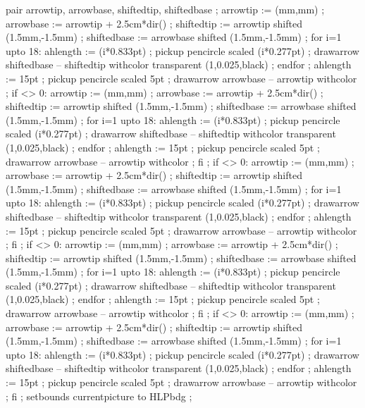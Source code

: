 pair arrowtip, arrowbase, shiftedtip, shiftedbase ;
arrowtip := (mm,mm) ;
arrowbase := arrowtip + 2.5cm*dir() ;
shiftedtip := arrowtip shifted (1.5mm,-1.5mm) ;
shiftedbase := arrowbase shifted (1.5mm,-1.5mm) ;
for i=1 upto 18:
	ahlength := (i*0.833pt) ;
	pickup pencircle scaled (i*0.277pt) ;
	drawarrow shiftedbase -- shiftedtip withcolor transparent (1,0.025,black) ;
endfor ;
ahlength := 15pt ;
pickup pencircle scaled 5pt ;
drawarrow arrowbase -- arrowtip withcolor  ;
if  <> 0:
   arrowtip := (mm,mm) ;
   arrowbase := arrowtip + 2.5cm*dir() ;
   shiftedtip := arrowtip shifted (1.5mm,-1.5mm) ;
   shiftedbase := arrowbase shifted (1.5mm,-1.5mm) ;
   for i=1 upto 18:
   	ahlength := (i*0.833pt) ;
   	pickup pencircle scaled (i*0.277pt) ;
   	drawarrow shiftedbase -- shiftedtip withcolor transparent (1,0.025,black) ;
   endfor ;
   ahlength := 15pt ;
   pickup pencircle scaled 5pt ;
   drawarrow arrowbase -- arrowtip withcolor  ;
fi ;
if  <> 0:
   arrowtip := (mm,mm) ;
   arrowbase := arrowtip + 2.5cm*dir() ;
   shiftedtip := arrowtip shifted (1.5mm,-1.5mm) ;
   shiftedbase := arrowbase shifted (1.5mm,-1.5mm) ;
   for i=1 upto 18:
   	ahlength := (i*0.833pt) ;
   	pickup pencircle scaled (i*0.277pt) ;
   	drawarrow shiftedbase -- shiftedtip withcolor transparent (1,0.025,black) ;
   endfor ;
   ahlength := 15pt ;
   pickup pencircle scaled 5pt ;
   drawarrow arrowbase -- arrowtip withcolor  ;
fi ;
if  <> 0:
   arrowtip := (mm,mm) ;
   arrowbase := arrowtip + 2.5cm*dir() ;
   shiftedtip := arrowtip shifted (1.5mm,-1.5mm) ;
   shiftedbase := arrowbase shifted (1.5mm,-1.5mm) ;
   for i=1 upto 18:
   	ahlength := (i*0.833pt) ;
   	pickup pencircle scaled (i*0.277pt) ;
   	drawarrow shiftedbase -- shiftedtip withcolor transparent (1,0.025,black) ;
   endfor ;
   ahlength := 15pt ;
   pickup pencircle scaled 5pt ;
   drawarrow arrowbase -- arrowtip withcolor  ;
fi ;
if  <> 0:
   arrowtip := (mm,mm) ;
   arrowbase := arrowtip + 2.5cm*dir() ;
   shiftedtip := arrowtip shifted (1.5mm,-1.5mm) ;
   shiftedbase := arrowbase shifted (1.5mm,-1.5mm) ;
   for i=1 upto 18:
   	ahlength := (i*0.833pt) ;
   	pickup pencircle scaled (i*0.277pt) ;
   	drawarrow shiftedbase -- shiftedtip withcolor transparent (1,0.025,black) ;
   endfor ;
   ahlength := 15pt ;
   pickup pencircle scaled 5pt ;
   drawarrow arrowbase -- arrowtip withcolor  ;
fi ;
setbounds currentpicture to HLPbdg ;
\stopuseMPgraphic

